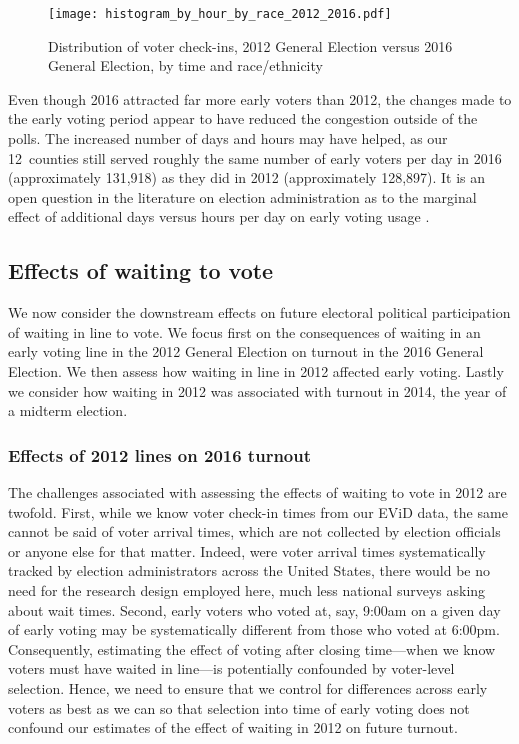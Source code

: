 \documentclass[12pt,titlepage]{article}
\newcommand{\numcounties}{12}
\begin{document}
\begin{figure}[!ht]
  \caption{Distribution of voter check-ins, 2012 General Election
    versus 2016 General Election, by time and race/ethnicity}
  \label{fig:race2012and2016}
  \centering
  \centering\texttt{[image: histogram\_by\_hour\_by\_race\_2012\_2016.pdf]}
\end{figure}

Even though 2016 attracted far more early voters than 2012, the
changes made to the early voting period appear to have reduced the
congestion outside of the polls. The increased number of days and
hours may have helped, as our \numcounties\ counties still served
roughly the same number of early voters per day in 2016 (approximately
131,918) as they did in 2012 (approximately 128,897). It is an open
question in the literature on election administration as to the
marginal effect of additional days versus hours per day on early
voting usage \citep[e.g.,][]{walkeretal:ncearly}.



\subsection*{Effects of waiting to vote}

We now consider the downstream effects on future electoral political
participation of waiting in line to vote. We focus first on the
consequences of waiting in an early voting line in the 2012 General
Election on turnout in the 2016 General Election. We then assess how
waiting in line in 2012 affected early voting. Lastly we consider how
waiting in 2012 was associated with turnout in 2014, the year of a
midterm election.

\subsubsection*{Effects of 2012 lines on 2016 turnout}

The challenges associated with assessing the effects of waiting to
vote in 2012 are twofold.  First, while we know voter check-in times
from our EViD data, the same cannot be said of voter arrival times,
which are not collected by election officials or anyone else for that
matter.  Indeed, were voter arrival times systematically tracked by
election administrators across the United States, there would be no
need for the research design employed here, much less national surveys
asking about wait times.  Second, early voters who voted at, say,
9:00am on a given day of early voting may be systematically different
from those who voted at 6:00pm. Consequently, estimating the effect of
voting after closing time---when we know voters must have waited in
line---is potentially confounded by voter-level selection.  Hence, we
need to ensure that we control for differences across early voters as
best as we can so that selection into time of early voting does not
confound our estimates of the effect of waiting in 2012 on future
turnout.
\end{document}
